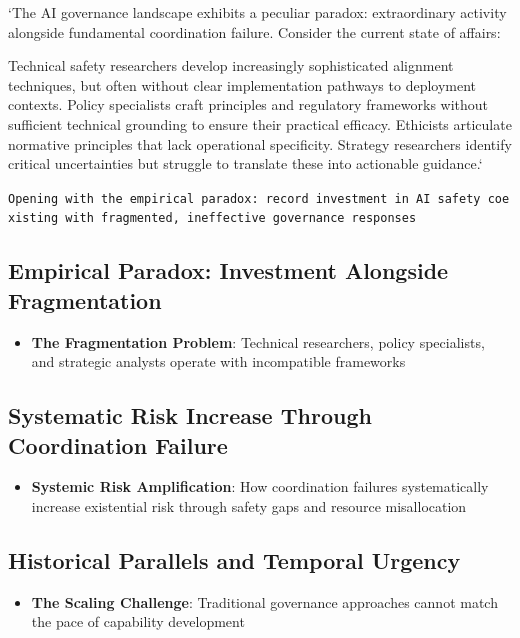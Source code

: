 \documentclass[
  11pt,
  letterpaper,
]{book}
\providecommand{\tightlist}{%
  \setlength{\itemsep}{0pt}\setlength{\parskip}{0pt}}
\begin{document}
`The AI governance landscape exhibits a peculiar paradox: extraordinary
activity alongside fundamental coordination failure. Consider the
current state of affairs:

Technical safety researchers develop increasingly sophisticated
alignment techniques, but often without clear implementation pathways to
deployment contexts. Policy specialists craft principles and regulatory
frameworks without sufficient technical grounding to ensure their
practical efficacy. Ethicists articulate normative principles that lack
operational specificity. Strategy researchers identify critical
uncertainties but struggle to translate these into actionable guidance.`

\texttt{Opening\ with\ the\ empirical\ paradox:\ record\ investment\ in\ AI\ safety\ coexisting\ with\ fragmented,\ ineffective\ governance\ responses}

\subsection{Empirical Paradox: Investment Alongside
Fragmentation}\label{sec-empirical-paradox}

\begin{itemize}
\tightlist
\item
  \textbf{The Fragmentation Problem}: Technical researchers, policy
  specialists, and strategic analysts operate with incompatible
  frameworks
\end{itemize}

\subsection{Systematic Risk Increase Through Coordination
Failure}\label{sec-risk-increase}

\begin{itemize}
\tightlist
\item
  \textbf{Systemic Risk Amplification}: How coordination failures
  systematically increase existential risk through safety gaps and
  resource misallocation
\end{itemize}

\subsection{Historical Parallels and Temporal
Urgency}\label{sec-historical-parallels}

\begin{itemize}
\tightlist
\item
  \textbf{The Scaling Challenge}: Traditional governance approaches
  cannot match the pace of capability development
\end{itemize}
\end{document}
